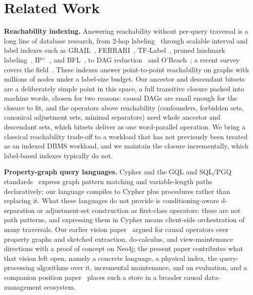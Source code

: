 \section{Related Work}\label{sec:related}

\noindent\textbf{Reachability indexing.} Answering reachability without
per-query traversal is a long line of database research, from 2-hop
labeling~\cite{cohen2003reachability} through scalable interval and label
indexes such as GRAIL~\cite{yildirim2010grail}, FERRARI~\cite{seufert2013ferrari},
TF-Label~\cite{cheng2013tflabel}, pruned landmark
labeling~\cite{yano2013pruned}, IP$^+$~\cite{wei2014ip}, and
BFL~\cite{su2017bfl}, to DAG reduction~\cite{zhou2017dagreduction} and
O'Reach~\cite{hanauer2022oreach}; a recent survey covers the
field~\cite{reachabilitysurvey2025}. These indexes answer point-to-point
reachability on graphs with millions of nodes under a label-size budget. Our
ancestor and descendant bitsets are a deliberately simple point in this
space, a full transitive closure packed into machine words, chosen for two
reasons: causal DAGs are small enough for the closure to fit, and the
operators above reachability (confounders, forbidden sets, canonical
adjustment sets, minimal separators) need whole ancestor and descendant sets,
which bitsets deliver as one word-parallel operation. We bring a classical
reachability trade-off to a workload that has not previously been treated as
an indexed DBMS workload, and we maintain the closure incrementally, which
label-based indexes typically do not.

\noindent\textbf{Property-graph query languages.} Cypher and the GQL and
SQL/PGQ standards~\cite{deutsch2022gql,francis2023gpc} express graph pattern
matching and variable-length paths declaratively; our language compiles to
Cypher plus procedures rather than replacing it. What these languages do not
provide is conditioning-aware d-separation or adjustment-set construction as
first-class operators: these are not path patterns, and expressing them in
Cypher means client-side orchestration of many traversals. Our earlier vision
paper~\cite{pachera2025whatif} argued for causal operators over property
graphs and sketched extraction, do-calculus, and view-maintenance directions
with a proof of concept on Neo4j; the present paper contributes what that
vision left open, namely a concrete language, a physical index, the
query-processing algorithms over it, incremental maintenance, and an
evaluation, and a companion position paper~\cite{qiu2026causal} places such a
store in a broader causal data-management ecosystem.

